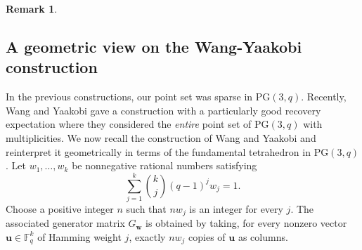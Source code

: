 \documentclass{article}
\newtheorem{remark}{Remark}
\newcommand{\PG}{\mathrm{PG}}
\newcommand{\F}{\mathbb{F}}
\begin{document}
\begin{remark}

  \end{remark}

\subsection{A geometric view on the Wang-Yaakobi construction}\label{subs:WY}
In the previous constructions, our point set was sparse in $\PG(3,q)$. Recently, Wang and Yaakobi gave a construction with a particularly good  recovery expectation where they considered the {\em entire} point set of $\PG(3,q)$ with multiplicities.
We now recall the construction of Wang and Yaakobi \cite{WangYaakobi2026} and reinterpret it geometrically in terms of the fundamental tetrahedron in $\PG(3,q)$. Let $w_1,\ldots,w_k$ be nonnegative rational numbers
satisfying
\[
 \sum_{j=1}^{k}\binom{k}{j}(q-1)^j w_j=1.
\]
Choose a positive integer $n$ such that $nw_j$ is an integer for every $j$.
The associated generator matrix $G_{\mathbf w}$ is obtained by taking, for
every nonzero vector $\mathbf u\in\F_q^k$ of Hamming weight $j$, exactly
$nw_j$ copies of $\mathbf u$ as columns. 
\end{document}
